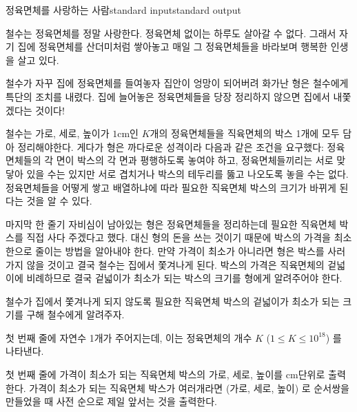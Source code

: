 \begin{problem}{정육면체를 사랑하는 사람}{standard input}{standard output}

철수는 정육면체를 정말 사랑한다. 정육면체 없이는 하루도 살아갈 수 없다.
그래서 자기 집에 정육면체를 산더미처럼 쌓아놓고 매일 그 정육면체들을 바라보며 행복한 인생을 살고 있다.

철수가 자꾸 집에 정육면체를 들여놓자 집안이 엉망이 되어버려 화가난 형은 철수에게 특단의 조치를 내렸다.
집에 늘어놓은 정육면체들을 당장 정리하지 않으면 집에서 내쫓겠다는 것이다!

철수는 가로, 세로, 높이가 $1$cm인 $K$개의 정육면체들을 직육면체의 박스 1개에 모두 담아 정리해야한다.
게다가 형은 까다로운 성격이라 다음과 같은 조건을 요구했다: 
정육면체들의 각 면이 박스의 각 면과 평행하도록 놓여야 하고, 
정육면체들끼리는 서로 맞닿아 있을 수는 있지만 서로 겹치거나 박스의 테두리를 뚫고 나오도록 놓을 수는 없다.
정육면체들을 어떻게 쌓고 배열하냐에 따라 필요한 직육면체 박스의 크기가 바뀌게 된다는 것을 알 수 있다.

마지막 한 줄기 자비심이 남아있는 형은 정육면체들을 정리하는데 필요한 직육면체 박스를 직접 사다 주겠다고 했다.
대신 형의 돈을 쓰는 것이기 때문에 박스의 가격을 최소한으로 줄이는 방법을 알아내야 한다.
만약 가격이 최소가 아니라면 형은 박스를 사러 가지 않을 것이고 결국 철수는 집에서 쫓겨나게 된다.
박스의 가격은 직육면체의 겉넓이에 비례하므로 결국 겉넓이가 최소가 되는 박스의 크기를 형에게 알려주어야 한다.

철수가 집에서 쫓겨나게 되지 않도록 필요한 직육면체 박스의 겉넓이가 최소가 되는 크기를 구해 철수에게 알려주자.

\InputFile
첫 번째 줄에 자연수 1개가 주어지는데, 이는 정육면체의 개수 $K$ ($1 \le K \le 10^{18}$) 를 나타낸다.

\OutputFile
첫 번째 줄에 가격이 최소가 되는 직육면체 박스의 가로, 세로, 높이를 cm단위로 출력한다.
가격이 최소가 되는 직육면체 박스가 여러개라면 (가로, 세로, 높이) 로 순서쌍을 만들었을 때
사전 순으로 제일 앞서는 것을 출력한다.

\Example

\begin{example}
%
%
\end{example}

\end{problem}
